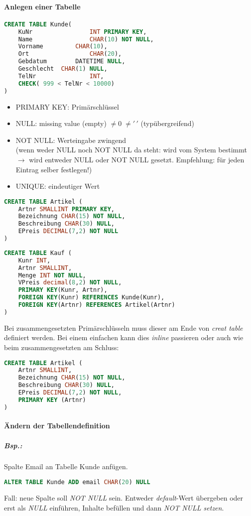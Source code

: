 \paragraph{Anlegen einer Tabelle}
\begin{lstlisting}[language=SQL]
CREATE TABLE Kunde(
	KuNr	 			INT PRIMARY KEY,
	Name 				CHAR(10) NOT NULL, 
	Vorname 		CHAR(10),
	Ort					CHAR(20),
	Gebdatum 		DATETIME NULL,
	Geschlecht	CHAR(1) NULL,
	TelNr				INT,
	CHECK( 999 < TelNr < 10000)
)
\end{lstlisting}
\begin{itemize}
\item PRIMARY KEY: Primärschlüssel
\item NULL: missing value (empty) $\not =0\; \not = '\,'$ (typübergreifend)
\item NOT NULL: Werteingabe zwingend\\
(wenn weder NULL noch NOT NULL da steht: wird vom System bestimmt $\to$ wird entweder NULL oder NOT NULL gesetzt. Empfehlung: für jeden Eintrag selber festlegen!)
\item UNIQUE: eindeutiger Wert
\end{itemize}
\begin{lstlisting}[language=SQL]
CREATE TABLE Artikel (
	Artnr SMALLINT PRIMARY KEY, 
	Bezeichnung CHAR(15) NOT NULL,
	Beschreibung CHAR(30) NULL,
	EPreis DECIMAL(7,2) NOT NULL
)
\end{lstlisting}
\begin{lstlisting}[language=SQL]
CREATE TABLE Kauf (
	Kunr INT,
	Artnr SMALLINT,
	Menge INT NOT NULL,
	VPreis decimal(8,2) NOT NULL, 
	PRIMARY KEY(Kunr, Artnr), 
	FOREIGN KEY(Kunr) REFERENCES Kunde(Kunr),
	FOREIGN KEY(Artnr) REFERENCES Artikel(Artnr)
)
\end{lstlisting}
Bei zusammengesetzten Primärschlüsseln muss dieser am Ende von \emph{creat table} definiert werden. Bei einem einfachen kann dies \emph{inline} passieren oder auch wie beim zusammengesetzten am Schluss: 
\begin{lstlisting}[language=SQL]
CREATE TABLE Artikel (
	Artnr SMALLINT, 
	Bezeichnung CHAR(15) NOT NULL,
	Beschreibung CHAR(30) NULL,
	EPreis DECIMAL(7,2) NOT NULL,
	PRIMARY KEY (Artnr)
)
\end{lstlisting}
\paragraph{Ändern der Tabellendefinition}
\subparagraph{Bsp.:} Spalte Email an Tabelle Kunde anfügen.
\begin{lstlisting}[language=SQL]
ALTER TABLE Kunde ADD email CHAR(20) NULL
\end{lstlisting}
Fall: neue Spalte soll \emph{NOT NULL} sein. Entweder \emph{default}-Wert übergeben oder erst als \emph{NULL} einführen, Inhalte befüllen und dann \emph{NOT NULL setzen}.
